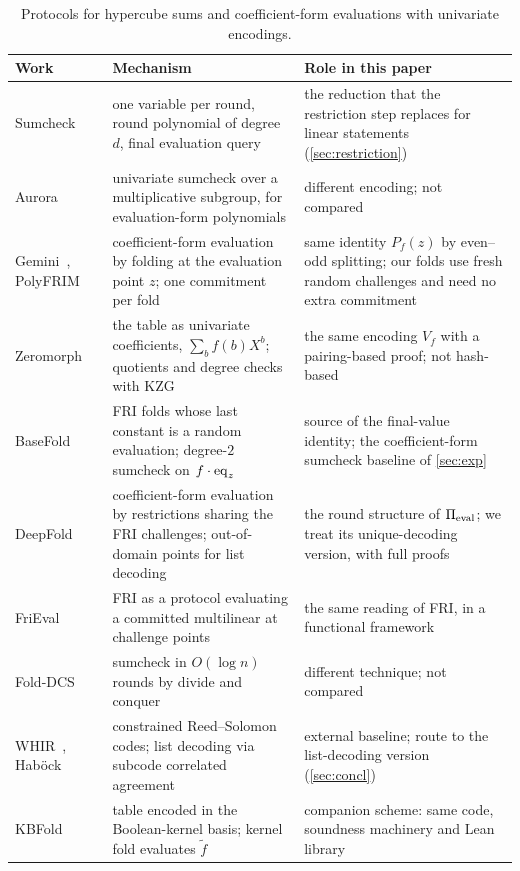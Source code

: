 \begin{table}[t]
\centering
\small
\begin{tabular}{@{}p{}p{}p{}@{}}
\toprule
Work & Mechanism & Role in this paper \\
\midrule
Sumcheck~\cite{LFKN92} & one variable per round, round polynomial of degree $d$, final evaluation query & the reduction that the restriction step replaces for linear statements (\cref{sec:restriction}) \\
Aurora~\cite{BCRSVW19} & univariate sumcheck over a multiplicative subgroup, for evaluation-form polynomials & different encoding; not compared \\
Gemini~\cite{BCHO22}, PolyFRIM~\cite{ZLGSCLD24} & coefficient-form evaluation by folding at the evaluation point $z$; one commitment per fold & same identity $P_f(z)$ by even--odd splitting; our folds use fresh random challenges and need no extra commitment \\
Zeromorph~\cite{KT24} & the table as univariate coefficients, $\sum_b f(b) X^{b}$; quotients and degree checks with KZG & the same encoding $V_f$ with a pairing-based proof; not hash-based \\
BaseFold~\cite{ZCF24} & FRI folds whose last constant is a random evaluation; degree-$2$ sumcheck on $f\cdot\mathrm{eq}_z$ & source of the final-value identity; the coefficient-form sumcheck baseline of \cref{sec:exp} \\
DeepFold~\cite{GLHQTZ25} & coefficient-form evaluation by restrictions sharing the FRI challenges; out-of-domain points for list decoding & the round structure of $\Pi_{\mathrm{eval}}$; we treat its unique-decoding version, with full proofs \\
FriEval~\cite{Zha25} & FRI as a protocol evaluating a committed multilinear at challenge points & the same reading of FRI, in a functional framework \\
Fold-DCS~\cite{LMN25} & sumcheck in $O(\log n)$ rounds by divide and conquer & different technique; not compared \\
WHIR~\cite{ACFY24}, Hab\"ock~\cite{Hab24} & constrained Reed--Solomon codes; list decoding via subcode correlated agreement & external baseline; route to the list-decoding version (\cref{sec:concl}) \\
KBFold~\cite{Mkh26} & table encoded in the Boolean-kernel basis; kernel fold evaluates $\tilde f$ & companion scheme: same code, soundness machinery and Lean library \\
\bottomrule
\end{tabular}
\caption{Protocols for hypercube sums and coefficient-form evaluations with univariate encodings.}
\label{tab:position}
\end{table}

